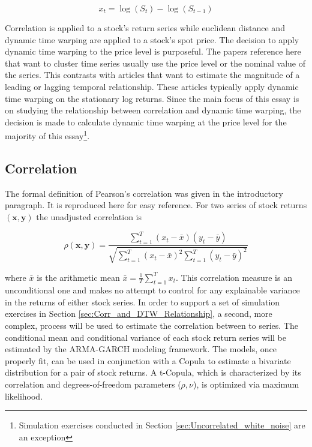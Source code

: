 \begin{equation} \label{eq:log_return_def}
    x_{t} = \log \left(S_{t}\right) - \log\left(S_{t-1}\right)
\end{equation}

 Correlation is applied to a stock's return series while euclidean distance and dynamic time warping are applied to a stock's spot price. The decision to apply dynamic time warping to the price level is purposeful. The papers reference here that want to cluster time series usually use the price level or the nominal value of the series. This contrasts with articles that want to estimate the magnitude of a leading or lagging temporal relationship. These articles typically apply dynamic time warping on the stationary log returns. Since the main focus of this essay is on studying the relationship between correlation and dynamic time warping, the decision is made to calculate dynamic time warping at the price level for the majority of this essay\footnote{Simulation exercises conducted in Section \ref{sec:Uncorrelated_white_noise} are an exception}.


\subsection{Correlation}

The formal definition of Pearson's correlation was given in the introductory paragraph. It is reproduced here for easy reference. For two series of stock returns $(\boldsymbol{x}, \boldsymbol{y})$ the unadjusted correlation is

\begin{equation} \label{eq:pearsons_rho}
\rho(\boldsymbol{x}, \boldsymbol{y}) = \frac{ \sum_{t=1}^{T} (x_{t} - \bar{x}) (y_{t} - \bar{y})}{ \sqrt{\sum_{t=1}^{T} (x_{t} - \bar{x})^{2} \sum_{t=1}^{T} (y_{t} - \bar{y})^{2}}}
\end{equation}

where $\bar{x}$ is the arithmetic mean $\bar{x} = \frac{1}{T}\sum^{T}_{t=1} x_{t}$. This correlation measure is an unconditional one and makes no attempt to control for any explainable variance in the returns of either stock series. In order to support a set of simulation exercises in Section \ref{sec:Corr_and_DTW_Relationship}, a second, more complex, process will be used to estimate the correlation between to series. The conditional mean and conditional variance of each stock return series will be estimated by the ARMA-GARCH modeling framework. The models, once properly fit, can be used in conjunction with a Copula to estimate a bivariate distribution for a pair of stock returns. A t-Copula, which is characterized by its correlation and degrees-of-freedom parameters ($\rho, \nu$), is optimized via maximum likelihood.

